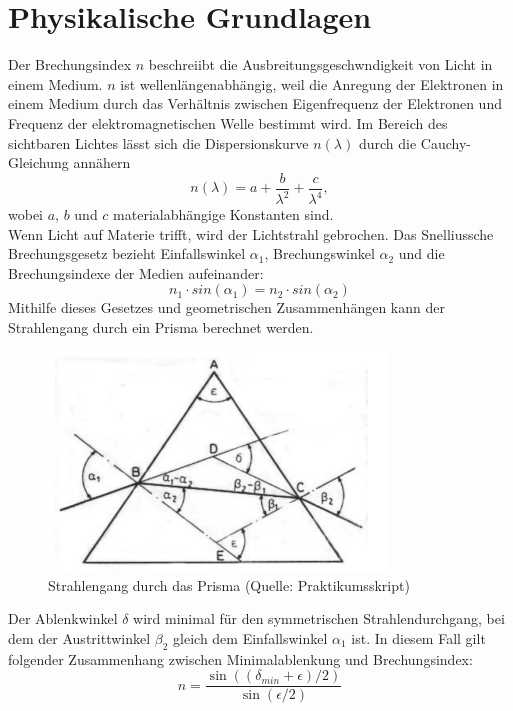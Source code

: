\documentclass[12pt,a4paper]{article}
\begin{document}
\section{Physikalische Grundlagen}
Der Brechungsindex $n$ beschreiibt die Ausbreitungsgeschwndigkeit von Licht in einem Medium. $n$ ist wellenlängenabhängig, weil die Anregung der Elektronen in einem Medium durch das Verhältnis zwischen Eigenfrequenz der Elektronen und Frequenz der elektromagnetischen Welle bestimmt wird. Im Bereich des sichtbaren Lichtes lässt sich die Dispersionskurve $n(\lambda)$ durch die Cauchy-Gleichung annähern
\begin{equation}\label{eq:Cauchy-Gleichung}
n(\lambda)=a+\frac{b}{\lambda^2}+\frac{c}{\lambda^4},
\end{equation}
wobei $a$, $b$ und $c$ materialabhängige Konstanten sind.\\
Wenn Licht auf Materie trifft, wird der Lichtstrahl gebrochen. Das Snelliussche Brechungsgesetz bezieht Einfallswinkel $\alpha_1$, Brechungswinkel $\alpha_2$ und die Brechungsindexe der Medien aufeinander:
\begin{equation}
n_1 \cdot sin(\alpha_1) = n_2 \cdot sin(\alpha_2)
\end{equation}
Mithilfe dieses Gesetzes und geometrischen Zusammenhängen kann der Strahlengang durch ein Prisma berechnet werden.
\begin{figure}[H]
	\centering
	\includegraphics[width=0.8\textwidth]{Prisma_Strahlengang.png}
	\caption{Strahlengang durch das Prisma (Quelle: Praktikumsskript)}
	\label{Prisma_Strahlengang}
\end{figure}
Der Ablenkwinkel $\delta$ wird minimal für den symmetrischen Strahlendurchgang, bei dem der Austrittwinkel $\beta_2$ gleich dem Einfallswinkel $\alpha_1$ ist. In diesem Fall gilt folgender Zusammenhang zwischen Minimalablenkung und Brechungsindex:
\begin{equation}\label{eq:n_aus_delmin}
n=\frac{\sin((\delta_{min}+\epsilon)/2)}{\sin(\epsilon/2)}
\end{equation}
\end{document}

